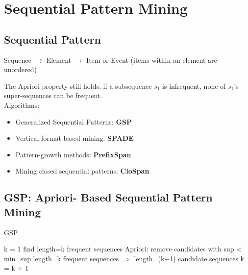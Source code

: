 \section{Sequential Pattern Mining}

\subsection{Sequential Pattern}
Sequence $\to$ Element $\to$ Item or Event (items within an element are unordered)

The Apriori property still holds: if a subsequence $s_1$ is infrequent, none of $s_1$’s super-sequences can be frequent.\\

Algorithms:
\begin{itemize}
\item Generalized Sequential Patterns: \textbf{GSP}
\item Vertical format-based mining: \textbf{SPADE}
\item Pattern-growth methods: \textbf{PrefixSpan}
\item Mining closed sequential patterns: \textbf{CloSpan}
\end{itemize}


\subsection{GSP: Apriori- Based Sequential Pattern Mining}

\begin{algorithm}
\caption{GSP}
\begin{algorithmic}
\State k = 1
\Repeat
    \State find length=k frequent sequences
    \State Apriori: remove candidates with sup < min\_sup
    \State length=k frequent sequences $\Rightarrow$ length=(k+1) candidate sequences
    \State k = k + 1
\end{algorithmic}
\end{algorithm}


